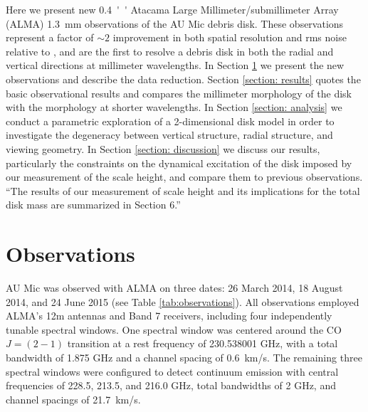 \documentclass[12pt,oneside]{article}
\begin{document}
Here we present new \SI{0.4}{''} Atacama Large Millimeter/submillimeter Array \newline (ALMA) \SI{1.3}{mm} observations of the AU Mic debris disk. 
These observations represent a factor of $\sim 2$ improvement in both spatial resolution and rms noise relative to \cite{macgregor13}, and are the first to resolve a debris disk in both the radial and vertical directions at millimeter wavelengths. 
In Section \ref{section: observations} we present the new observations and describe the data reduction.  
Section \ref{section: results} quotes the basic observational results and compares the millimeter morphology of the disk with the morphology at shorter wavelengths.  
In Section \ref{section: analysis} we conduct a parametric exploration of a 2-dimensional disk model in order to investigate the degeneracy between vertical structure, radial structure, and viewing geometry.
In Section \ref{section: discussion} we discuss our results, particularly the constraints on the dynamical excitation of the disk imposed by our measurement of the scale height, and compare them to previous observations.
“The results of our measurement of scale height and its implications for the total disk mass are summarized in Section 6.” 



\section{Observations}
\label{section: observations}
AU Mic was observed  with ALMA on three dates: 26 March 2014, 18 August 2014, and 24 June 2015 (see Table \ref{tab:observations}). 
All observations employed ALMA's 12m antennas and Band 7 receivers, including four independently tunable spectral windows. 
One spectral window was centered around the CO $J = (2-1)$ transition at a rest frequency of 230.538001 GHz, with a total bandwidth of 1.875 GHz and a channel spacing of \SI{0.6}{km/s}.
The remaining three spectral windows were configured to detect continuum emission with central frequencies of 228.5, 213.5, and 216.0 GHz, total bandwidths of 2 GHz, and channel spacings of \SI{21.7}{km/s}.

\end{document}
